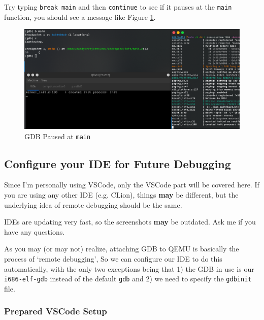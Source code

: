 Try typing \texttt{break main} and then \texttt{continue} to see if it pauses at the \texttt{main}
function, you should see a message like Figure \ref{fig:gdb-paused}.

\begin{figure}[ht]
    \centering
    \includegraphics[width=\textwidth]{assets/c1.gdb-paused.png}
    \caption{GDB Paused at \texttt{main}}
    \label{fig:gdb-paused}
\end{figure}

\subsection{Configure your IDE for Future Debugging} \label{sec:ide-config}

\begin{note}
    \item Since I'm personally using VSCode, only the VSCode part will be covered here. If you are
    using any other IDE (e.g. CLion), things \textbf{may} be different, but the underlying idea
    of remote debugging should be the same.

    \item IDEs are updating very fast, so the screenshots \textbf{may} be outdated. Ask me if you
    have any questions.
\end{note}

As you may (or may not) realize, attaching GDB to QEMU is basically the process of `remote debugging',
So we can configure our IDE to do this automatically, with the only two exceptions being that
1) the GDB in use is our \texttt{i686-elf-gdb} instead of the default \texttt{gdb} and 2) we need to
specify the \texttt{gdbinit} file.

\subsubsection{Prepared VSCode Setup} \label{sec:vscode-config}

